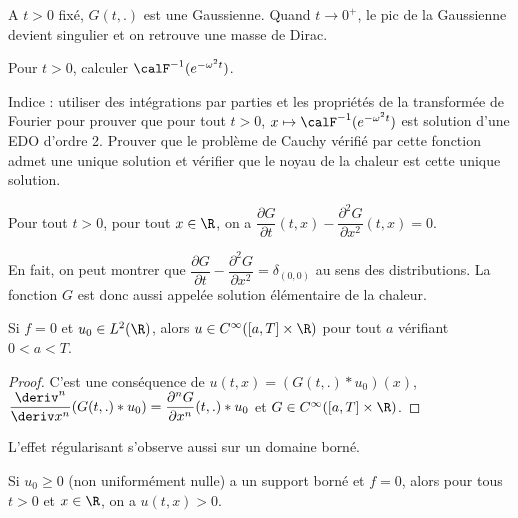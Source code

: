 \documentclass[12pt,a4paper,twoside]{article}
\begin{document}
\begin{remark}
  A $t>0$ fix\'e, $G(t,.)$ est une Gaussienne.
  Quand $t \to 0^+$, le pic de la Gaussienne devient singulier et on retrouve une masse de Dirac.
\end{remark}

\begin{exercise}
  \label{exo:noyau_chaleur}
  Pour $t > 0$, calculer $\calF^{-1}(e^{-\omega^2 t})$.

  Indice : utiliser des int\'egrations par parties et les propri\'et\'es de la transform\'ee
  de Fourier pour prouver que pour tout $t > 0$, $x \mapsto \calF^{-1}(e^{-\omega^2 t})$ est solution
  d'une EDO d'ordre 2.
  Prouver que le probl\`eme de Cauchy v\'erifi\'e par cette fonction admet une unique solution
  et v\'erifier que le noyau de la chaleur est cette unique solution.
\end{exercise}


\begin{proposition}
  Pour tout $t > 0$, pour tout $x \in \R$, on a
  $\dfrac{\partial G}{\partial t}(t,x) - \dfrac{\partial^2 G}{\partial x^2}(t,x) = 0$.
\end{proposition}

\begin{remark}
  En fait, on peut montrer que
  $\dfrac{\partial G}{\partial t} - \dfrac{\partial^2 G}{\partial x^2} = \delta_{(0,0)}$
  au sens des distributions.
  La fonction $G$ est donc aussi appel\'ee solution \'el\'ementaire de la chaleur.
\end{remark}

\begin{proposition}
  Si $f=0$ et $u_0 \in L^2(\R)$, alors $u \in C^{\infty}([a,T] \times \R)$ pour tout $a$ v\'erifiant
  $0 < a < T$.
\end{proposition}

\begin{proof}
  C'est une cons\'equence de $u(t,x) = (G(t,.) * u_0)(x)$,
  $\dfrac{\deriv^n}{\deriv x^n}(G(t,.) * u_0) = \dfrac{\partial^n G}{\partial x^n}(t,.) * u_0$
  et $G \in C^{\infty}([a,T] \times \R)$.
\end{proof}

\begin{remark}
  L'effet r\'egularisant s'observe aussi sur un domaine born\'e.
\end{remark}

\begin{proposition}
  Si $u_0 \geq 0$ (non uniform\'ement nulle)
  a un support born\'e et $f=0$, alors pour tous $t > 0$ et $x \in \R$,
  on a $u(t,x) > 0$.
\end{proposition}
\end{document}
